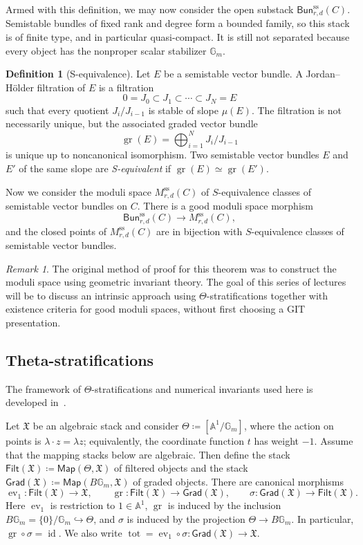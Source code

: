 \documentclass{amsart}
\theoremstyle{definition}
\newtheorem{defn}[thm]{Definition}
\theoremstyle{remark}
\newtheorem{rmk}[thm]{Remark}
\theoremstyle{plain}
\theoremstyle{definition}
\theoremstyle{remark}
\newcommand{\A}{\mathbb{A}}
\newcommand{\G}{\mathbb{G}}
\newcommand{\mf}[1]{\mathfrak{#1}}
\newcommand{\mr}[1]{\mathrm{#1}}
\newcommand{\on}[1]{\operatorname{#1}}
\newcommand{\ms}[1]{\mathsf{#1}}
\newcommand{\1}{\mathbf{1}}
\newcommand{\2}{\mathbf{2}}
\newcommand{\3}{\mathbf{3}}
\DeclareMathOperator{\ev}{ev}
\begin{document}
Armed with this definition, we may now consider the open substack \(\ms{Bun}_{r,d}^{\mr{ss}}(C)\). Semistable bundles of fixed rank and degree form a bounded family, so this stack is of finite type, and in particular quasi-compact. It is still not separated because every object has the nonproper scalar stabilizer \(\G_m\).

\begin{defn}[S-equivalence]
    Let \(E\) be a semistable vector bundle. A Jordan--H\"older filtration of \(E\) is a filtration
    \[ 0=J_0\subset J_1\subset\cdots\subset J_N=E \]
    such that every quotient \(J_i/J_{i-1}\) is stable of slope \(\mu(E)\). The filtration is not necessarily unique, but the associated graded vector bundle
    \[
        \on{gr}(E)=\bigoplus_{i=1}^N J_i/J_{i-1}
    \]
    is unique up to noncanonical isomorphism. Two semistable vector bundles \(E\) and \(E'\) of the same slope are \textit{S-equivalent} if \(\on{gr}(E)\simeq\on{gr}(E')\).
\end{defn}

Now we consider the moduli space \(M_{r,d}^{\mr{ss}}(C)\) of \(S\)-equivalence classes of semistable vector bundles on \(C\). There is a good moduli space morphism
\[
    \ms{Bun}_{r,d}^{\mr{ss}}(C)\longrightarrow M_{r,d}^{\mr{ss}}(C),
\]
and the closed points of \(M_{r,d}^{\mr{ss}}(C)\) are in bijection with \(S\)-equivalence classes of semistable vector bundles.

\begin{rmk}
    The original method of proof for this theorem was to construct the moduli space using geometric invariant theory. The goal of this series of lectures will be to discuss an intrinsic approach using \(\Theta\)-stratifications together with existence criteria for good moduli spaces, without first choosing a GIT presentation.
\end{rmk}


\subsection{Theta-stratifications}%
\label{sub:Theta-stratifications}

The framework of \(\Theta\)-stratifications and numerical invariants used here is developed in~\cite{HLinstability}.

Let \(\mf{X}\) be an algebraic stack and consider \(\Theta\coloneqq[\A^1/\G_m]\), where the action on points is \(\lambda\cdot z=\lambda z\); equivalently, the coordinate function \(t\) has weight \(-1\). Assume that the mapping stacks below are algebraic. Then define the stack \(\ms{Filt}(\mf{X})\coloneqq\ms{Map}(\Theta,\mf{X})\) of filtered objects and the stack \(\ms{Grad}(\mf{X})\coloneqq\ms{Map}(B\G_m,\mf{X})\) of graded objects. There are canonical morphisms
\[
    \ev_1\colon\ms{Filt}(\mf{X})\to\mf{X},
    \qquad
    \on{gr}\colon\ms{Filt}(\mf{X})\to\ms{Grad}(\mf{X}),
    \qquad
    \sigma\colon\ms{Grad}(\mf{X})\to\ms{Filt}(\mf{X}).
\]
Here \(\ev_1\) is restriction to \(1\in\A^1\), \(\on{gr}\) is induced by the inclusion \(B\G_m=\{0\}/\G_m\hookrightarrow\Theta\), and \(\sigma\) is induced by the projection \(\Theta\to B\G_m\). In particular, \(\on{gr}\circ\sigma=\on{id}\). We also write \(\on{tot}=\ev_1\circ\sigma\colon\ms{Grad}(\mf{X})\to\mf{X}\).
\end{document}
